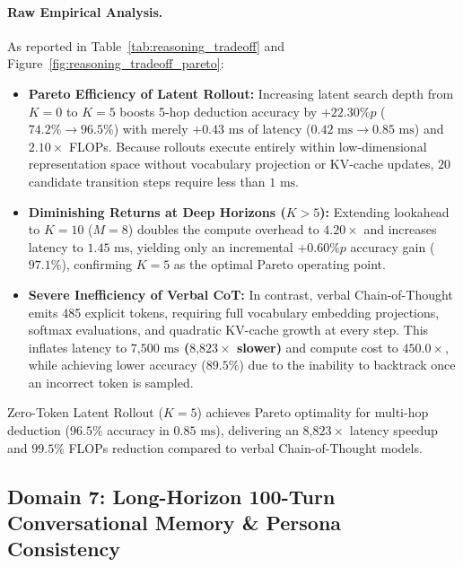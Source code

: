 \paragraph{Raw Empirical Analysis.}
As reported in Table~\ref{tab:reasoning_tradeoff} and Figure~\ref{fig:reasoning_tradeoff_pareto}:
\begin{itemize}[leftmargin=*]
    \item \textbf{Pareto Efficiency of Latent Rollout:} Increasing latent search depth from $K=0$ to $K=5$ boosts 5-hop deduction accuracy by \textbf{$+22.30\%p$} ($74.2\% \rightarrow 96.5\%$) with merely \textbf{$+0.43\text{ ms}$} of latency ($0.42\text{ ms} \rightarrow 0.85\text{ ms}$) and $2.10\times$ FLOPs. Because rollouts execute entirely within low-dimensional representation space without vocabulary projection or KV-cache updates, $20$ candidate transition steps require less than $1\text{ ms}$.
    \item \textbf{Diminishing Returns at Deep Horizons ($K > 5$):} Extending lookahead to $K=10$ ($M=8$) doubles the compute overhead to $4.20\times$ and increases latency to $1.45\text{ ms}$, yielding only an incremental $+0.60\%p$ accuracy gain ($97.1\%$), confirming $K=5$ as the optimal Pareto operating point.
    \item \textbf{Severe Inefficiency of Verbal CoT:} In contrast, verbal Chain-of-Thought emits 485 explicit tokens, requiring full vocabulary embedding projections, softmax evaluations, and quadratic KV-cache growth at every step. This inflates latency to \textbf{$7\text{,}500\text{ ms}$ ($8\text{,}823\times$ slower)} and compute cost to \textbf{$450.0\times$}, while achieving lower accuracy ($89.5\%$) due to the inability to backtrack once an incorrect token is sampled.
\end{itemize}

\begin{takeawaybox}
Zero-Token Latent Rollout ($K=5$) achieves Pareto optimality for multi-hop deduction ($96.5\%$ accuracy in $0.85\text{ ms}$), delivering an $8\text{,}823\times$ latency speedup and $99.5\%$ FLOPs reduction compared to verbal Chain-of-Thought models.
\end{takeawaybox}

\subsection{Domain 7: Long-Horizon 100-Turn Conversational Memory \& Persona Consistency}
\label{sec:exp_dialogue_100turn}

